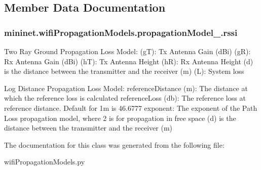 \subsection{Member Data Documentation}
\hypertarget{classmininet_1_1wifiPropagationModels_1_1propagationModel___a5597e99932232cbe0e9879394c8055a3}{
\subsubsection[{rssi}]{\setlength{\rightskip}{0pt plus 5cm}mininet.\-wifi\-Propagation\-Models.\-propagation\-Model\-\_\-.\-rssi}}\label{classmininet_1_1wifiPropagationModels_1_1propagationModel___a5597e99932232cbe0e9879394c8055a3}
\begin{DoxyVerb}Two Ray Ground Propagation Loss Model:
(gT): Tx Antenna Gain (dBi)
(gR): Rx Antenna Gain (dBi)
(hT): Tx Antenna Height
(hR): Rx Antenna Height
(d) is the distance between the transmitter and the receiver (m)
(L): System loss\end{DoxyVerb}


\begin{DoxyVerb}Log Distance Propagation Loss Model:
referenceDistance (m): The distance at which the reference loss is calculated
referenceLoss (db): The reference loss at reference distance. Default for 1m is 46.6777
exponent: The exponent of the Path Loss propagation model, where 2 is for propagation in free space
(d) is the distance between the transmitter and the receiver (m)\end{DoxyVerb}
 

The documentation for this class was generated from the following file\-:\begin{DoxyCompactItemize}
\item 
wifi\-Propagation\-Models.\-py\end{DoxyCompactItemize}
